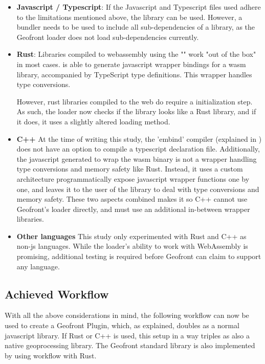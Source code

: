 \begin{itemize}[-]
  \item \textbf{Javascript / Typescript}: 
    If the Javascript and Typescript files used adhere to the limitations mentioned above, the library can be used. 
    However, a bundler needs to be used to include all sub-dependencies of a library, as the Geofront loader does not load sub-dependencies currently. 

  \item \textbf{Rust}:
    Libraries compiled to webassembly using the "" work "out of the box" in most cases.
     is able to generate javascript wrapper bindings for a \ac{wasm} library, accompanied by TypeScript type definitions. 
    This wrapper handles type conversions. 
    
    However, rust libraries compiled to the web do require a initialization step. 
    As such, the loader now checks if the library looks like a Rust library, and if it does, it uses a slightly altered loading method.
  \item \textbf{C++}
    At the time of writing this study, the 'embind' compiler (explained in ) does not have an option to compile a typescript declaration file. 
    Additionally, the javascript generated to wrap the wasm binary is not a wrapper handling type conversions and memory safety like Rust. 
    Instead, it uses a custom architecture programmatically expose javascript wrapper functions one by one, and leaves it to the user of the library to deal with type conversions and memory safety. 
    These two aspects combined makes it so C++ cannot use Geofront's loader directly, and must use an additional in-between wrapper libraries.

  \item \textbf{Other languages}
    This study only experimented with Rust and C++ as non-js languages.
    While the loader's ability to work with WebAssembly is promising, additional testing is required before Geofront can claim to support any language. 
\end{itemize}

\subsection{Achieved Workflow}
\label{sec:implementation:workflow}


With all the above considerations in mind, the following workflow can now be used to create a Geofront Plugin, which, as explained, doubles as a normal javascript library. 
If Rust or C++ is used, this setup in a way triples as also a native geoprocessing library.
The Geofront standard library is also implemented by using workflow with Rust.

